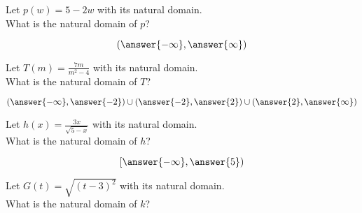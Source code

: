 \documentclass{ximera}
\author{Lee Wayand}
\begin{document}
\begin{exercise}










\begin{question}


Let $p(w) = 5 - 2w$ with its natural domain. \\

What is the natural domain of $p$?

\[
\left( \answer{-\infty}, \answer{\infty}  \right)
\]


\end{question}









\begin{question}


Let $T(m) = \frac{7m}{m^2 - 4}$ with its natural domain. \\

What is the natural domain of $T$?

\[
\left( \answer{-\infty}, \answer{-2} \right) \cup \left( \answer{-2}, \answer{2}  \right)   \cup \left( \answer{2}, \answer{\infty}  \right)
\]


\end{question}







\begin{question}


Let $h(x) = \frac{3x}{\sqrt{5-x}}$ with its natural domain. \\

What is the natural domain of $h$?

\[
\left[ \answer{-\infty}, \answer{5}  \right)
\]


\end{question}








\begin{question}


Let $G(t) = \sqrt{(t - 3)^2}$ with its natural domain. \\

What is the natural domain of $k$?


\end{question}
\end{exercise}
\end{document}

